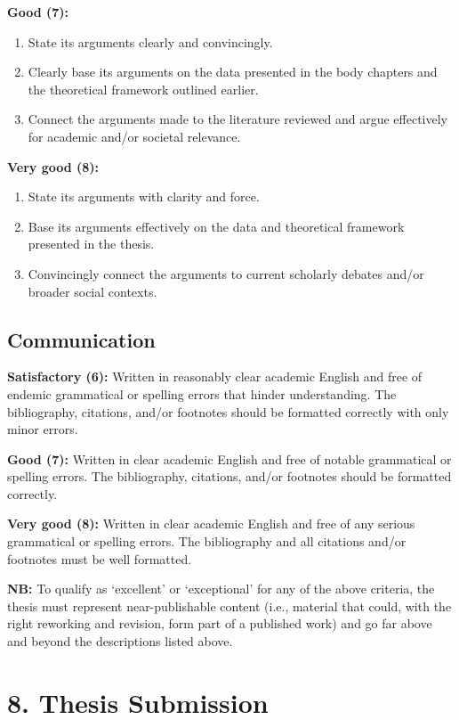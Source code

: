 \documentclass[11pt,a4paper]{article}
\begin{document}
\textbf{Good (7):}
\begin{enumerate}[label=\Alph*.]
    \item State its arguments clearly and convincingly.
    \item Clearly base its arguments on the data presented in the body chapters and the theoretical framework outlined earlier.
    \item Connect the arguments made to the literature reviewed and argue effectively for academic and/or societal relevance.
\end{enumerate}

\textbf{Very good (8):}
\begin{enumerate}[label=\Alph*.]
    \item State its arguments with clarity and force.
    \item Base its arguments effectively on the data and theoretical framework presented in the thesis.
    \item Convincingly connect the arguments to current scholarly debates and/or broader social contexts.
\end{enumerate}

\subsection{Communication}

\textbf{Satisfactory (6):} Written in reasonably clear academic English and free of endemic grammatical or spelling errors that hinder understanding. The bibliography, citations, and/or footnotes should be formatted correctly with only minor errors.

\textbf{Good (7):} Written in clear academic English and free of notable grammatical or spelling errors. The bibliography, citations, and/or footnotes should be formatted correctly.

\textbf{Very good (8):} Written in clear academic English and free of any serious grammatical or spelling errors. The bibliography and all citations and/or footnotes must be well formatted.

\bigskip

\textbf{NB:} To qualify as `excellent' or `exceptional' for any of the above criteria, the thesis must represent near-publishable content (i.e., material that could, with the right reworking and revision, form part of a published work) and go far above and beyond the descriptions listed above.

\section{8. Thesis Submission}
\end{document}
